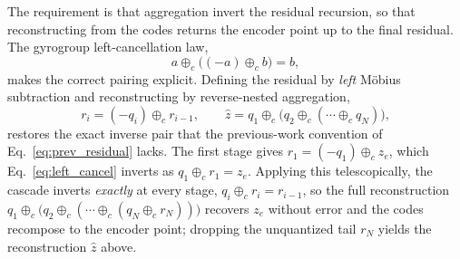\documentclass[12pt]{report}
\begin{document}
The requirement is that aggregation invert the residual recursion, so that reconstructing from the codes returns the encoder point up to the final residual. The gyrogroup left-cancellation law,
\begin{equation}
    \label{eq:left_cancel}
    a \oplus_c\big((-a)\oplus_c b\big) = b,
\end{equation}
makes the correct pairing explicit. Defining the residual by \emph{left} M\"obius subtraction and reconstructing by reverse-nested aggregation,
\begin{equation}
    \label{eq:hrq_residual}
    r_i = (-q_i)\oplus_c r_{i-1},
    \qquad
    \hat z = q_1\oplus_c\big(q_2\oplus_c(\cdots\oplus_c q_N)\big),
\end{equation}
restores the exact inverse pair that the previous-work convention of Eq.~\ref{eq:prev_residual} lacks. The first stage gives $r_1 = (-q_1)\oplus_c z_e$, which Eq.~\ref{eq:left_cancel} inverts as $q_1\oplus_c r_1 = z_e$. Applying this telescopically, the cascade inverts \emph{exactly} at every stage, $q_i\oplus_c r_i = r_{i-1}$, so the full reconstruction $q_1\oplus_c\big(q_2\oplus_c(\cdots\oplus_c(q_N\oplus_c r_N))\big)$ recovers $z_e$ without error and the codes recompose to the encoder point; dropping the unquantized tail $r_N$ yields the reconstruction $\hat z$ above.
\end{document}
